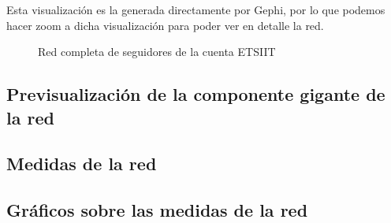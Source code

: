 Esta visualización es la generada directamente por Gephi, por lo que podemos hacer zoom a dicha visualización para poder ver en detalle la red.

\newpage
\begin{figure}[H]
	\centering
	
	\caption{Red completa de seguidores de la cuenta ETSIIT}
\end{figure}
\newpage


\subsection{Previsualización de la componente gigante de la red}

\subsection{Medidas de la red}

\subsection{Gráficos sobre las medidas de la red}
